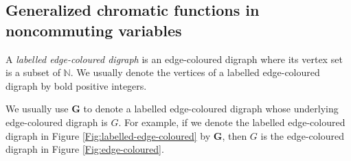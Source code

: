 \documentclass[11pt]{amsart}
\numberwithin{equation}{section}
\newcommand{\bfG}{{\mathbf{G}}}
\begin{document}
\subsection{Generalized chromatic functions in noncommuting variables}

A \emph{labelled edge-coloured digraph} is an edge-coloured digraph where its vertex set is a subset of $\mathbb{N}$. We usually denote the vertices of a labelled edge-coloured digraph by bold positive integers. 
\begin{center} 
   \label{Fig:labelled-edge-coloured}
 \end{center} 
We usually use $\bfG$  to denote a labelled edge-coloured digraph whose underlying edge-coloured digraph is $G$. For example, if we denote the labelled edge-coloured digraph in Figure \ref{Fig:labelled-edge-coloured} by $\bfG$, then $G$ is the edge-coloured digraph in Figure \ref{Fig:edge-coloured}. 
\end{document}
